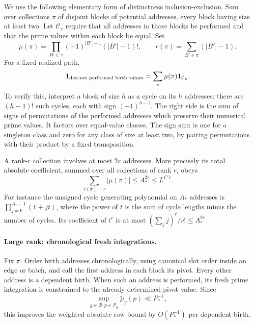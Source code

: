 We use the following elementary form of distinctness
inclusion-exclusion.  Sum over collections $\pi$ of
disjoint blocks of potential addresses, every block
having size at least two.  Let $\mathcal C_\pi$ require
that all addresses in those blocks be performed and
that the prime values within each block be equal.  Set
\begin{equation}\label{eq:distinct-birth-expansion}
 \mu(\pi)=\prod_{B'\in\pi}(-1)^{|B'|-1}(|B'|-1)!,
 \qquad r(\pi)=\sum_{B'\in\pi}(|B'|-1).
\end{equation}
For a fixed realized path,
\begin{equation}\label{eq:distinct-indicator}
 \mathbf 1_{\text{distinct performed birth values}}
       =\sum_\pi\mu(\pi)\mathbf 1_{\mathcal C_\pi}.
\end{equation}
To verify this, interpret a block of size $h$ as a cycle
on its $h$ addresses: there are $(h-1)!$ such cycles,
each with sign $(-1)^{h-1}$.  The right side is the sum
of signs of permutations of the performed addresses
which preserve their numerical prime values.  It factors
over equal-value classes.  The sign sum is one for a
singleton class and zero for any class of size at least
two, by pairing permutations with their product by a
fixed transposition.

A rank-$r$ collection involves at most $2r$ addresses.
More precisely its total absolute coefficient, summed
over all collections of rank $r$, obeys
\begin{equation}\label{eq:rank-coefficient-count}
 \sum_{r(\pi)=r}|\mu(\pi)|\le A_*^{2r}\le L^{C'r}.
\end{equation}
For instance the unsigned cycle generating polynomial
on $A_*$ addresses is $\prod_{j=0}^{A_*-1}(1+jt)$,
where the power of $t$ is the sum of cycle lengths
minus the number of cycles.  Its coefficient of $t^r$
is at most $(\sum_jj)^r/r!\le A_*^{2r}$.

\paragraph{Large rank: chronological fresh integrations.}
Fix $\pi$.  Order birth addresses chronologically, using
canonical slot order inside an edge or batch, and call
the first address in each block its pivot.  Every other
address is a dependent birth.  When such an address is
performed, its fresh prime integration is constrained
to the already determined pivot value.  Since
\begin{equation}\label{eq:tilted-point-mass}
 \sup_{g\in\mathcal B,p\in\mathcal P_g}
                 \widetilde\mu_g(p)\ll P_*^{-1},
\end{equation}
this improves the weighted absolute row bound by
$O(P_*^{-1})$ per dependent birth.

